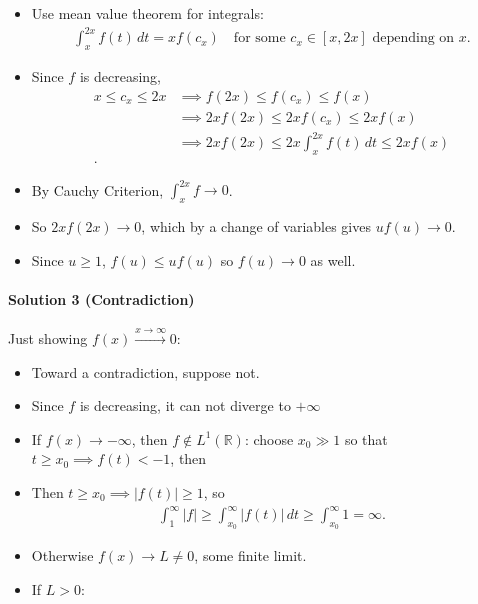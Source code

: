 \begin{solution}
\begin{itemize}
\item
  Use mean value theorem for integrals:
  \begin{align*}
  \int_x^{2x} f(t)\, dt = xf(c_x) \quad\text{for some $c_x \in [x, 2x]$ depending on $x$}
  .\end{align*}
\item
  Since \(f\) is decreasing,
  \begin{align*}
  x\leq c_x \leq 2x 
  &\implies f(2x)\leq f(c_x) \leq f(x) \\
  &\implies 2xf(2x)\leq 2xf(c_x) \leq 2xf(x) \\
  &\implies 2xf(2x)\leq 2x\int_x^{2x} f(t)\, dt \leq 2xf(x) \\
  .\end{align*}
\item
  By Cauchy Criterion, \(\int_x^{2x} f \to 0\).
\item
  So \(2x f(2x) \to 0\), which by a change of variables gives
  \(uf(u) \to 0\).
\item
  Since \(u\geq 1\), \(f(u) \leq uf(u)\) so \(f(u) \to 0\) as well.
\end{itemize}

\hypertarget{solution-3-contradiction}{%
\paragraph{Solution 3 (Contradiction)}\label{solution-3-contradiction}}

Just showing \(f(x) \overset{x\to \infty}\to 0\):

\begin{itemize}
\item
  Toward a contradiction, suppose not.
\item
  Since \(f\) is decreasing, it can not diverge to \(+\infty\)
\item
  If \(f(x) \to -\infty\), then \(f\not\in L^1({\mathbb{R}})\): choose
  \(x_0 \gg 1\) so that \(t\geq x_0 \implies f(t) < -1\), then
\item
  Then \(t\geq x_0 \implies {\left\lvert {f(t)} \right\rvert} \geq 1\),
  so
  \begin{align*}
  \int_1^\infty {\left\lvert {f} \right\rvert} \geq \int_{x_0}^\infty {\left\lvert {f(t) } \right\rvert} \, dt \geq \int_{x_0}^\infty 1 =\infty
   .\end{align*}
\item
  Otherwise \(f(x) \to L\neq 0\), some finite limit.
\item
  If \(L>0\):


\end{itemize}
\end{solution}
